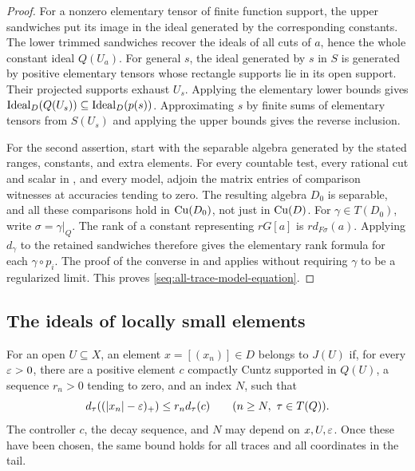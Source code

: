\begin{proof}
For a nonzero elementary tensor of finite function support, the
upper sandwiches put its image in the ideal generated by the
corresponding constants. The lower trimmed sandwiches recover the
ideals of all cuts of \(a\), hence the whole constant ideal
\(Q(U_a)\).
For general \(s\), the ideal generated by \(s\) in \(S\) is
generated by positive elementary tensors whose rectangle supports
lie in its open support. Their projected supports exhaust \(U_s\).
Applying the elementary lower bounds gives
\(\operatorname{Ideal}_D(Q(U_s))\subseteq\operatorname{Ideal}_D(p(s))\).
Approximating \(s\) by finite sums of elementary tensors from
\(S(U_s)\) and applying the upper bounds gives the reverse inclusion.

For the second assertion, start with the separable algebra generated
by the stated ranges, constants, and extra elements. For every
countable test, every rational cut and scalar in
, and every model, adjoin the matrix entries of
comparison witnesses at accuracies tending to zero. The resulting
algebra \(D_0\) is separable, and all these comparisons hold in
\(\operatorname{Cu}(D_0)\), not just in \(\operatorname{Cu}(D)\).
For \(\gamma\in T(D_0)\), write \(\sigma=\gamma|_Q\).
The rank of a constant representing \(rG[a]\) is
\(r d_{F\sigma}(a)\). Applying \(d_\gamma\) to the retained
sandwiches therefore gives the elementary rank formula for each
\(\gamma\circ p_i\). The proof of the converse in
 and  applies without
requiring \(\gamma\) to be a regularized limit. This proves
\eqref{seq:all-trace-model-equation}.
\end{proof}

\subsection{The ideals of locally small elements}

\begin{definition}\label{seq:smallideal}
For an open \(U\subseteq X\), an element \(x=[(x_n)]\in D\)
belongs to \(J(U)\) if, for every \(\varepsilon>0\), there are a positive
element \(c\) compactly Cuntz supported in \(Q(U)\), a sequence
\(r_n>0\) tending to zero, and an index \(N\), such that
\begin{equation}\label{seq:smallideal-bound}
 d_\tau((|x_n|-\varepsilon)_+)
 \leq r_n d_\tau(c)
 \qquad(n\geq N,\ \tau\in T(Q)).
\end{equation}
The controller \(c\), the decay sequence, and \(N\) may depend on
\(x,U,\varepsilon\). Once these have been chosen, the same bound holds
for all traces and all coordinates in the tail.
\end{definition}

